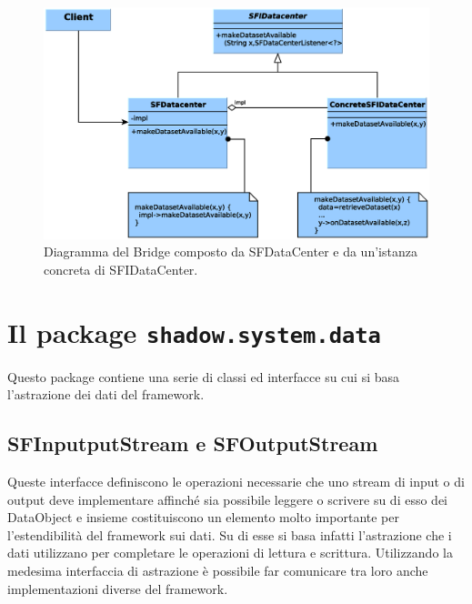 \begin{figure}
\begin{center}
\includegraphics[width=\textwidth]{Immagini/DataCenter}
\caption{Diagramma del Bridge composto da SFDataCenter e da un'istanza concreta di SFIDataCenter.\label{f:datacenterimplementation}} 
\end{center} 
\end{figure}


\section{Il package \texttt{shadow.system.data}}
\label{sec:shadow_system_data}
Questo package contiene una serie di classi ed interfacce su cui si basa l'astrazione dei dati del framework.

\subsection{SFInputputStream e SFOutputStream}
\label{sub:sfinoutstream}
Queste interfacce definiscono le operazioni necessarie che uno stream di input o di output deve implementare affinch\'e sia possibile leggere o scrivere su di esso dei DataObject e insieme costituiscono un elemento molto importante per l'estendibilit\`a del framework sui dati. Su di esse si basa infatti l'astrazione che i dati utilizzano per completare le operazioni di lettura e scrittura. Utilizzando la medesima interfaccia di astrazione \`e possibile far comunicare tra loro anche implementazioni diverse del framework.

